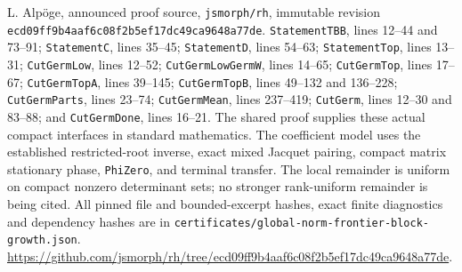 L. Alp\"oge, announced proof source, \texttt{jsmorph/rh}, immutable
revision \texttt{ecd09ff9b4aaf6c08f2b5ef17dc49ca9648a77de}.
\texttt{StatementTBB}, lines 12--44 and 73--91;
\texttt{StatementC}, lines 35--45;
\texttt{StatementD}, lines 54--63;
\texttt{StatementTop}, lines 13--31;
\texttt{CutGermLow}, lines 12--52;
\texttt{CutGermLowGermW}, lines 14--65;
\texttt{CutGermTop}, lines 17--67;
\texttt{CutGermTopA}, lines 39--145;
\texttt{CutGermTopB}, lines 49--132 and 136--228;
\texttt{CutGermParts}, lines 23--74;
\texttt{CutGermMean}, lines 237--419;
\texttt{CutGerm}, lines 12--30 and 83--88;
and \texttt{CutGermDone}, lines 16--21.
The shared proof supplies these actual compact interfaces in
standard mathematics.  The coefficient model uses the established
restricted-root inverse, exact mixed Jacquet pairing, compact
matrix stationary phase, \texttt{PhiZero}, and terminal transfer.
The local remainder is uniform on compact nonzero determinant
sets; no stronger rank-uniform remainder is being cited.
All pinned file and bounded-excerpt hashes, exact finite diagnostics
and dependency hashes are in
\texttt{certificates/global-norm-frontier-block-growth.json}.
\url{https://github.com/jsmorph/rh/tree/ecd09ff9b4aaf6c08f2b5ef17dc49ca9648a77de}.
